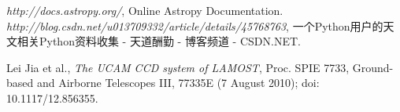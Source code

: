 \documentclass[12pt,twoside,letterpaper]{article}
\begin{document}
   \begin{thebibliography}{99}



      \emph{http://docs.astropy.org/}, Online Astropy Documentation.
      \emph{http://blog.csdn.net/u013709332/article/details/45768763}, 一个Python用户的天文相关Python资料收集 - 天道酬勤 - 博客频道 - CSDN.NET.

      Lei Jia et al., \emph{The UCAM CCD system of LAMOST}, Proc. SPIE 7733, Ground-based and Airborne Telescopes III, 77335E (7 August 2010); doi: 10.1117/12.856355.


   \end{thebibliography}
\end{document}
